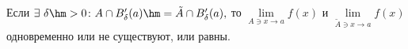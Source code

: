 
        Если $\exists\ \delta\hm>0\colon A\cap B'_\delta(a)\hm=\tilde A\cap B'_\delta(a),$ то $\lim\limits_{A\ni x\to a}f(x)$ и
        $\lim\limits_{\tilde A\ni x\to a}f(x)$ одновременно или не существуют, или равны.
    